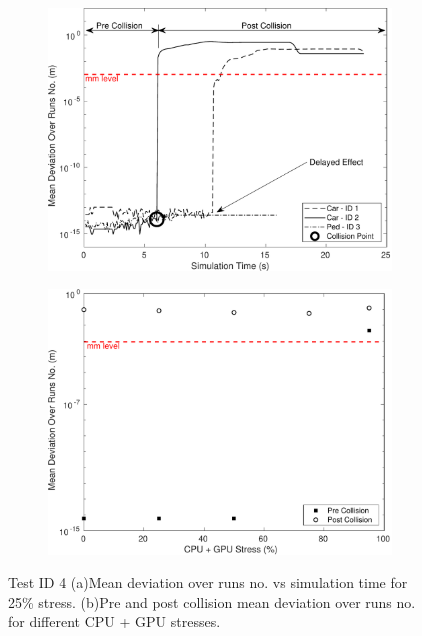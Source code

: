 \begin{figure}[h]
    \centering
    \begin{subfigure}{.49\textwidth}
        \includegraphics[width=1\textwidth]{Other/Figures/CarsPeopleCollsionsCG25.pdf}
        \caption{}
        \label{CarsPeopleCollsionsCG25}
    \end{subfigure}
    \begin{subfigure}{.49\textwidth}
        \includegraphics[width=1\textwidth]{Other/Figures/CarsPeopleCollisionPrePost.pdf}
        \caption{}
        \label{CarsPeopleCollisionPrePost}
    \end{subfigure}
    \caption{Test ID 4 (a)Mean deviation over runs no. vs simulation time for 25\% stress. (b)Pre and post collision mean deviation over runs no. for different CPU + GPU stresses.}
\end{figure}

